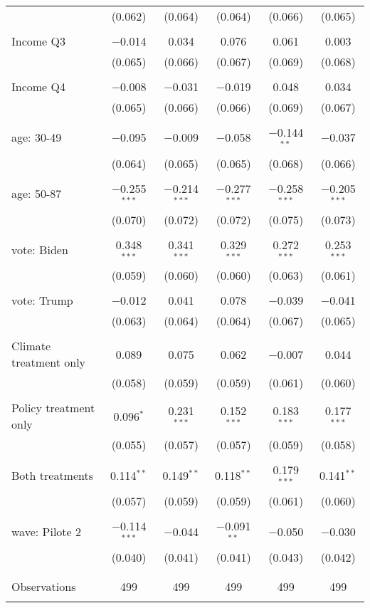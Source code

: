 \begin{tabular}{@{\extracolsep{5pt}}lccccc}
  & (0.062) & (0.064) & (0.064) & (0.066) & (0.065) \\ 
  & & & & & \\ 
 Income Q3 & $-$0.014 & 0.034 & 0.076 & 0.061 & 0.003 \\ 
  & (0.065) & (0.066) & (0.067) & (0.069) & (0.068) \\ 
  & & & & & \\ 
 Income Q4 & $-$0.008 & $-$0.031 & $-$0.019 & 0.048 & 0.034 \\ 
  & (0.065) & (0.066) & (0.066) & (0.069) & (0.067) \\ 
  & & & & & \\ 
 age: 30-49 & $-$0.095 & $-$0.009 & $-$0.058 & $-$0.144$^{**}$ & $-$0.037 \\ 
  & (0.064) & (0.065) & (0.065) & (0.068) & (0.066) \\ 
  & & & & & \\ 
 age: 50-87 & $-$0.255$^{***}$ & $-$0.214$^{***}$ & $-$0.277$^{***}$ & $-$0.258$^{***}$ & $-$0.205$^{***}$ \\ 
  & (0.070) & (0.072) & (0.072) & (0.075) & (0.073) \\ 
  & & & & & \\ 
 vote: Biden & 0.348$^{***}$ & 0.341$^{***}$ & 0.329$^{***}$ & 0.272$^{***}$ & 0.253$^{***}$ \\ 
  & (0.059) & (0.060) & (0.060) & (0.063) & (0.061) \\ 
  & & & & & \\ 
 vote: Trump & $-$0.012 & 0.041 & 0.078 & $-$0.039 & $-$0.041 \\ 
  & (0.063) & (0.064) & (0.064) & (0.067) & (0.065) \\ 
  & & & & & \\ 
 Climate treatment only & 0.089 & 0.075 & 0.062 & $-$0.007 & 0.044 \\ 
  & (0.058) & (0.059) & (0.059) & (0.061) & (0.060) \\ 
  & & & & & \\ 
 Policy treatment only & 0.096$^{*}$ & 0.231$^{***}$ & 0.152$^{***}$ & 0.183$^{***}$ & 0.177$^{***}$ \\ 
  & (0.055) & (0.057) & (0.057) & (0.059) & (0.058) \\ 
  & & & & & \\ 
 Both treatments & 0.114$^{**}$ & 0.149$^{**}$ & 0.118$^{**}$ & 0.179$^{***}$ & 0.141$^{**}$ \\ 
  & (0.057) & (0.059) & (0.059) & (0.061) & (0.060) \\ 
  & & & & & \\ 
 wave: Pilote 2 & $-$0.114$^{***}$ & $-$0.044 & $-$0.091$^{**}$ & $-$0.050 & $-$0.030 \\ 
  & (0.040) & (0.041) & (0.041) & (0.043) & (0.042) \\ 
  & & & & & \\ 
\hline \\[-1.8ex] 

Observations & 499 & 499 & 499 & 499 & 499 \\ 
\hline 
\hline \\[-1.8ex] 
\end{tabular} 